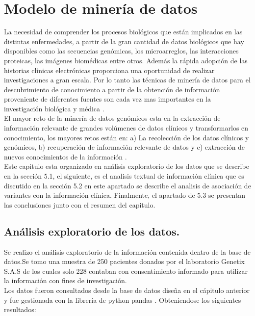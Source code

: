 \chapter{Modelo de minería de datos}

La necesidad de comprender los procesos biológicos que están implicados en las distintas enfermedades, a partir de la gran cantidad de datos biológicos que hay disponibles como las secuencias genómicas, los microarreglos, las interacciones proteicas, las imágenes biomédicas entre otros. Además la rápida adopción de las historias clínicas electrónicas proporciona una oportunidad de realizar investigaciones a gran escala. Por lo tanto las técnicas de minería de datos para el descubrimiento de conocimiento a partir de la obtención de información proveniente de diferentes fuentes son cada vez mas importantes en la investigación biológica y médica \cite{Wang2017}.\\

El mayor reto de la minería de datos genómicos esta en la extracción de información relevante de grandes volúmenes de datos clínicos y transformarlos en conocimiento, los mayores retos están en: a) La recolección de los datos clínicos y genómicos, b) recuperación de información relevante de datos y c) extracción de nuevos conocimientos de la información \cite{Farid2016}. \\  

Este capitulo esta organizado en análisis exploratorio de los datos que se describe en la sección 5.1, el siguiente, es el analisis textual de información clínica que es discutido en la sección 5.2 en este apartado se describe el analisis de asociación de variantes con la información clínica. Finalmente, el apartado de 5.3 se presentan las conclusiones junto con el resumen del capitulo. 

\section{Análisis exploratorio de los datos.}

Se realizo el análisis exploratorio de la información contenida dentro de la base de datos.Se tomo una muestra de 250 pacientes donados por el laboratorio Genetix S.A.S de los cuales solo 228 contaban con consentimiento informado para utilizar la información con fines de investigación.\\

Los datos fueron consultados desde la base de datos diseña en el cápitulo anterior y fue gestionada con la librería de python pandas \cite{mckinneypandas}. Obteniendose los siguientes resultados:

